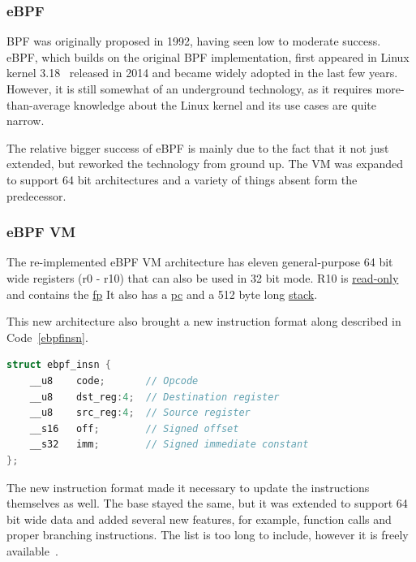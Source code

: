 \newpage
\subsubsection{eBPF}
\label{sec:ebpfrules}
BPF was originally proposed in 1992, having seen low to moderate success. eBPF, which builds on the original BPF implementation, first appeared in Linux kernel 3.18~\cite{kernel-318} released in 2014 and became widely adopted in the last few years. However, it is still somewhat of an underground technology, as it requires more-than-average knowledge about the Linux kernel and its use cases are quite narrow.

The relative bigger success of eBPF is mainly due to the fact that it not just extended, but reworked the technology from ground up. The VM was expanded to support 64 bit architectures and a variety of things absent form the predecessor.

\subsubsection{eBPF VM}
The re-implemented eBPF VM architecture has eleven general-purpose 64 bit wide registers (r0 - r10) that can also be used in 32 bit mode. R10 is \underline{\gls{read-only}} and contains the \underline{\gls{fp}} It also has a \underline{\gls{pc}} and a 512 byte long \underline{\gls{stack}}.

This new architecture also brought a new instruction format along described in Code~\ref{ebpfinsn}.
\begin{lstlisting}[language={C++}]
struct ebpf_insn {
	__u8	code;		// Opcode 
	__u8	dst_reg:4;	// Destination register
	__u8	src_reg:4;	// Source register
	__s16	off;		// Signed offset
	__s32	imm;		// Signed immediate constant
};
\end{lstlisting}

The new instruction format made it necessary to update the instructions themselves as well. The base stayed the same, but it was extended to support 64 bit wide data and added several new features, for example, function calls and proper branching instructions. The list is too long to include, however it is freely available~\cite{ebpf-instructions}.

